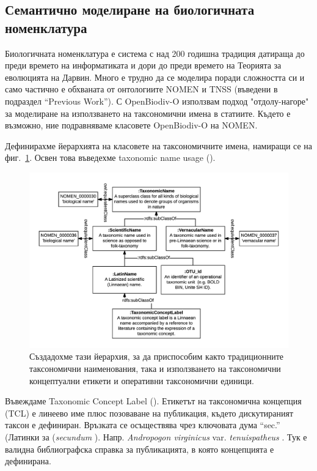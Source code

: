 \subsection{Семантично моделиране на биологичната номенклатура}

Биологичната номенклатура е система с над 200 годишна традиция датираща до преди времето на информатиката и дори до преди времето на Теорията за еволюцията на Дарвин. Много е трудно да се моделира поради сложността си и само частично е обхваната от онтологиите NOMEN и TNSS (въведени в подраздел ``Previous Work''). С OpenBiodiv-O използвам подход "отдолу-нагоре" за моделиране на използването на таксономични имена в статиите. Където е възможно, ние подравняваме класовете OpenBiodiv-O на NOMEN.

Дефинирахме йерархията на класовете на таксономичните имена, намиращи се на фиг.~\ref{taxonomic-name-class-hierarchy-diagram}. Освен това въведехме taxonomic name usage ().

\begin{figure}[h!]
  \centering
  \includegraphics[width=\textwidth]{Figures/taxonomic-name-class-hierarchy-diagram}
  \decoRule
  \caption[Taxonomic name class hierarchy diagram.]{Създадохме тази йерархия, за да приспособим както традиционните таксономични наименования, така и използването на таксономични концептуални етикети и оперативни таксономични единици.}
  \label{taxonomic-name-class-hierarchy-diagram}
\end{figure}

Въвеждаме Taxonomic Concept Label (). Етикетът на таксономична концепция (TCL) е линеево име плюс позоваване на публикация, където дискутираният таксон е дефиниран. Връзката се осъществява чрез ключовата дума ``sec.'' (Латинки за (\emph{secundum} \cite{berendsohn_concept_1995}). Напр. \emph{Andropogon virginicus} var. \emph{tenuispatheus} \cite{blomquist_grasses_1948}. Тук \cite{blomquist_grasses_1948} е валидна библиографска справка за публикацията, в която концепцията е дефинирана.


